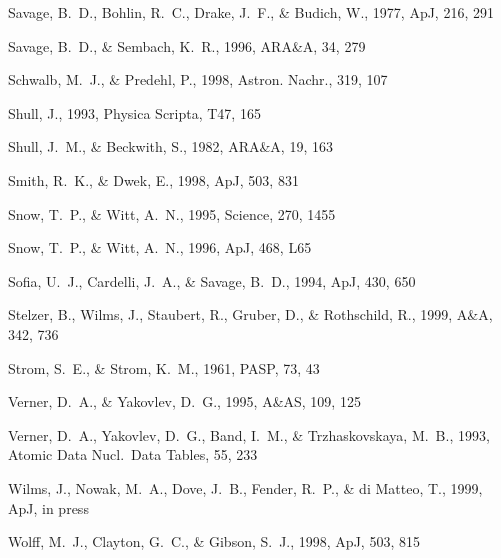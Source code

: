 \documentclass{aastex}
\begin{document}
\begin{thebibliography}{}
Savage, B.~D., Bohlin, R.~C., Drake, J.~F., \& Budich, W.,  1977, ApJ, 216, 291

Savage, B.~D., \& Sembach, K.~R.,  1996, ARA\&A, 34, 279

Schwalb, M.~J., \& Predehl, P.,  1998, Astron. Nachr., 319, 107

Shull, J.,  1993, Physica Scripta, T47, 165

Shull, J.~M., \& Beckwith, S.,  1982, ARA\&A, 19, 163

Smith, R.~K., \& Dwek, E.,  1998, ApJ, 503, 831

Snow, T.~P., \& Witt, A.~N.,  1995, Science, 270, 1455

Snow, T.~P., \& Witt, A.~N.,  1996, ApJ, 468, L65

Sofia, U.~J., Cardelli, J.~A., \& Savage, B.~D.,  1994, ApJ, 430, 650

Stelzer, B., Wilms, J., Staubert, R., Gruber, D., \& Rothschild, R.,  1999,
  A\&A, 342, 736

Strom, S.~E., \& Strom, K.~M.,  1961, PASP, 73, 43

Verner, D.~A., \& Yakovlev, D.~G.,  1995, A\&AS, 109, 125

Verner, D.~A., Yakovlev, D.~G., Band, I.~M., \& {Trzha\-skov\-ska\-ya}, M.~B.,
  1993, Atomic Data Nucl.\ Data Tables, 55, 233

Wilms, J., Nowak, M.~A., Dove, J.~B., Fender, R.~P., \& {di Matteo}, T.,  1999,
  ApJ,
\newblock in press

Wolff, M.~J., Clayton, G.~C., \& Gibson, S.~J.,  1998, ApJ, 503, 815


\end{thebibliography}
\end{document}
